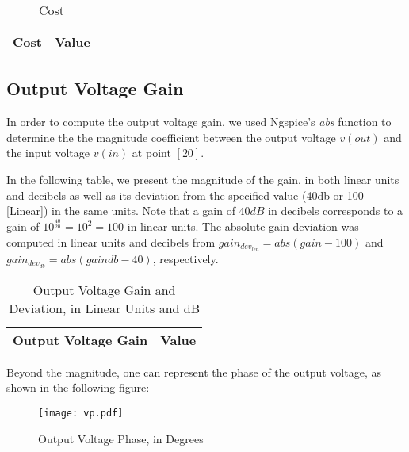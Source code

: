 \begin{table}[H]
  \centering
  \begin{tabular}{ |l|r| } 
    \hline    
    {\bf Cost} & {\bf Value} \\ \hline
    
  \end{tabular}
  \caption{Cost}
  \label{tab:cost}
\end{table}


\subsection{Output Voltage Gain}
\label{output_gain}
\par In order to compute the output voltage gain, we used Ngspice's \textit{abs} function to determine the the magnitude coefficient between the output voltage $v(out)$ and the input voltage $v(in)$ at point $[20]$.

\par In the following table, we present the magnitude of the gain, in both linear units and decibels as well as its deviation from the specified value (40db or 100 [Linear]) in the same units.
 Note that a gain of $40dB$ in decibels corresponds to a gain of $10^{\frac{40}{20}}=10^2=100$ in linear units.
 The absolute gain deviation was computed in linear units and decibels from $gain_{dev_{lin}}= abs(gain-100)$ and $gain_{dev_{db}} = abs(gaindb-40)$, respectively. 
 
\begin{table}[H]
  \centering
  \begin{tabular}{|l|r|}
    \hline    
    {\bf Output Voltage Gain} & {\bf Value} \\ \hline
    
  \end{tabular}
  \caption{Output Voltage Gain and Deviation, in Linear Units and dB}
  \label{tab:gain}
\end{table}

\par Beyond the magnitude, one can represent the phase of the output voltage, as shown in the following figure:

\begin{figure}[H] \centering
  \texttt{[image: vp.pdf]}
  \caption{Output Voltage Phase, in Degrees}
  \label{fig:vp}
\end{figure}



